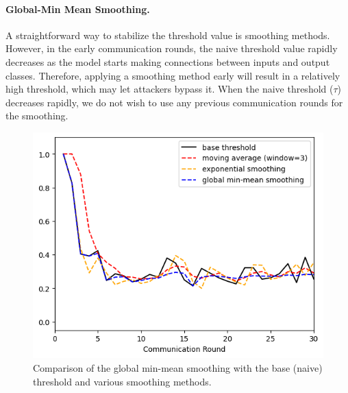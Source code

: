 \documentclass{article} %
\begin{document}

\vspace{-.25cm}
\paragraph{Global-Min Mean Smoothing.} 
A straightforward way to stabilize the threshold value is smoothing methods. However, in the early communication rounds, the naive threshold value rapidly decreases as the model starts making connections between inputs and output classes. Therefore, applying a smoothing method early will result in a relatively high threshold, which may let attackers bypass it. 
When the naive threshold ($\tau$) decreases rapidly, we do not wish to use any previous communication rounds for the smoothing. 

\begin{figure}
    \includegraphics[width=.4\textwidth]{pics/smoothing--d_rounds30.png}
    \caption{\footnotesize Comparison of the global min-mean smoothing with the base (naive) threshold and various smoothing methods. 
    }
    \label{fig: smoothing}
\end{figure}
\end{document}
